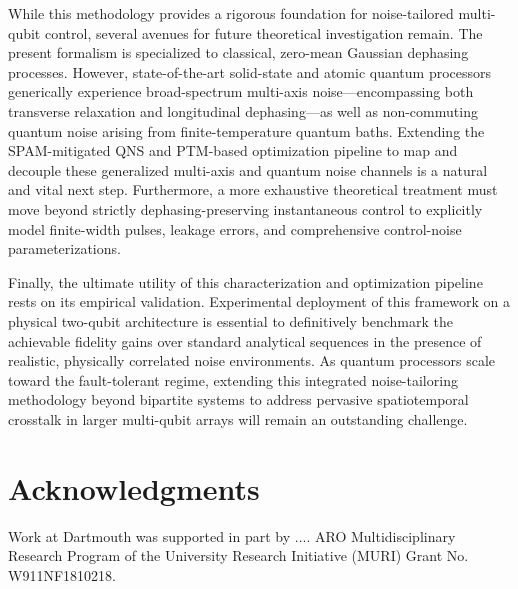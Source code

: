 \documentclass[%
 reprint,
superscriptaddress,
 amsmath,amssymb,
 aps,
pra,
]{revtex4-2}
\begin{document}
While this methodology provides a rigorous foundation for noise-tailored multi-qubit control, several avenues for future theoretical investigation remain. The present formalism is specialized to classical, zero-mean Gaussian dephasing processes. However, state-of-the-art solid-state and atomic quantum processors generically experience broad-spectrum multi-axis noise—encompassing both transverse relaxation and longitudinal dephasing—as well as non-commuting quantum noise arising from finite-temperature quantum baths. Extending the SPAM-mitigated QNS and PTM-based optimization pipeline to map and decouple these generalized multi-axis and quantum noise channels is a natural and vital next step. Furthermore, a more exhaustive theoretical treatment must move beyond strictly dephasing-preserving instantaneous control to explicitly model finite-width pulses, leakage errors, and comprehensive control-noise parameterizations.

Finally, the ultimate utility of this characterization and optimization pipeline rests on its empirical validation. Experimental deployment of this framework on a physical two-qubit architecture is essential to definitively benchmark the achievable fidelity gains over standard analytical sequences in the presence of realistic, physically correlated noise environments. As quantum processors scale toward the fault-tolerant regime, extending this integrated noise-tailoring methodology beyond bipartite systems to address pervasive spatiotemporal crosstalk in larger multi-qubit arrays will remain an outstanding challenge.

\smallskip

\section*{Acknowledgments} 

Work at Dartmouth was supported in part by .... ARO Multidisciplinary Research Program of the University Research Initiative (MURI) Grant No. W911NF1810218.


\end{document}
